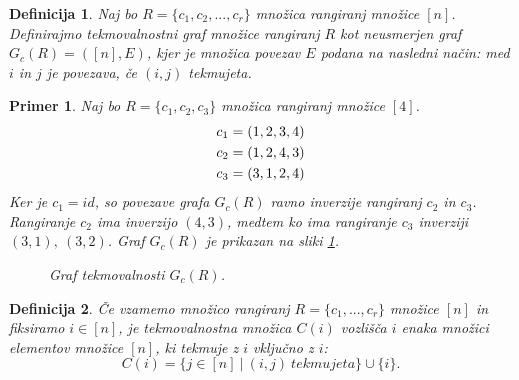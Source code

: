 \documentclass[a4paper, 12pt]{book}
\newtheorem{definicija}{Definicija}[chapter]
\newtheorem{primer}{Primer}[chapter]
\begin{document}
\begin{definicija}
    Naj bo $R = \{ c_1, c_2, ..., c_r \}$ množica rangiranj množice $[n]$. Definirajmo tekmovalnostni graf množice rangiranj $R$ kot neusmerjen graf $G_c(R) = ([n], E)$, kjer je množica povezav $E$ podana na nasledni način: med $i$ in $j$ je povezava, če $(i, j)$ tekmujeta.
\end{definicija}

\begin{primer}
\label{primer_tekmovalnostni_graf}
    Naj bo $R = \{ c_1, c_2, c_3 \}$ množica rangiranj množice $[4]$.
    \begin{align*}
        c_1 &= (1, 2, 3, 4) \notag\\
        c_2 &= (1, 2, 4, 3) \notag\\
        c_3 &= (3, 1, 2, 4) \notag
    \end{align*}
    Ker je $c_1=id$, so povezave grafa $G_c(R)$ ravno inverzije rangiranj $c_2$ in $c_3$. Rangiranje $c_2$ ima inverzijo $(4, 3)$, medtem ko ima rangiranje $c_3$ inverziji $(3, 1), \ (3, 2)$. Graf $G_c(R)$ je prikazan na sliki \ref{graf_tekmovalnosti_primer}.
    \begin{figure}[h]
        \begin{center}
        \end{center}
        \caption{Graf tekmovalnosti $G_c(R)$.}
        \label{graf_tekmovalnosti_primer}
    \end{figure}
\end{primer}


\begin{definicija}
    Če vzamemo množico rangiranj $R = \{ c_1, ..., c_r \}$ množice $[n]$ in fiksiramo $i \in [n]$, je tekmovalnostna množica $C(i)$ vozlišča $i$ enaka množici elementov množice $[n]$, ki tekmuje z $i$ vključno z $i$:
    \[
        C(i) = \{ j \in [n] \ | \ (i, j) \ tekmujeta \} \cup \{ i \}.
    \]
\end{definicija}
\end{document}
